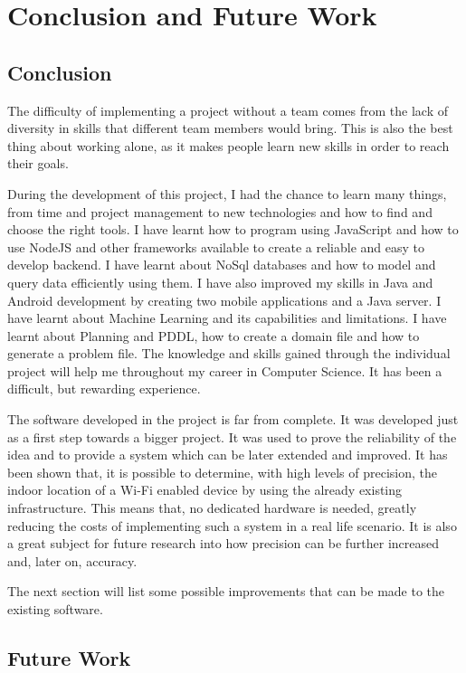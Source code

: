 \chapter{Conclusion and Future Work}

\section{Conclusion}
The difficulty of implementing a project without a team comes from the lack of diversity in skills that different team members would bring. This is also the best thing about working alone, as it makes people learn new skills in order to reach their goals. 

During the development of this project, I had the chance to learn many things, from time and project management to new technologies and how to find and choose the right tools. I have learnt how to program using JavaScript and how to use NodeJS and other frameworks available to create a reliable and easy to develop backend. I have learnt about NoSql databases and how to model and query data efficiently using them. 
I have also improved my skills in Java and Android development by creating two mobile applications and a Java server. I have learnt about Machine Learning and its capabilities and limitations. I have learnt about Planning and PDDL, how to create a domain file and how to generate a problem file. The knowledge and skills gained through the individual project will help me throughout my career in Computer Science. It has been a difficult, but rewarding experience. 

The software developed in the project is far from complete. It was developed just as a first step towards a bigger project. It was used to prove the reliability of the idea and to provide a system which can be later extended and improved. It has been shown that, it is possible to determine, with high levels of precision, the indoor location of a Wi-Fi enabled device by using the already existing infrastructure. This means that, no dedicated hardware is needed, greatly reducing the costs of implementing such a system in a real life scenario. It is also a great subject for future research into how precision can be further increased and, later on, accuracy. 
 
The next section will list some possible improvements that can be made to the existing software.

\section{Future Work}
